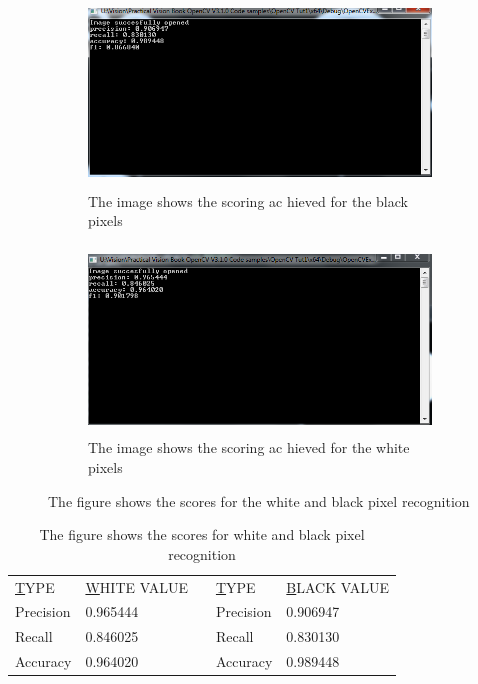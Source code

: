 \documentclass{article}
\begin{document}
\begin{figure}[H]
\begin{subfigure}{0.5\textwidth}
\includegraphics[width=0.9\linewidth, height=5cm]{N_BLK_STAT.PNG} 
\caption{The image shows the scoring ac hieved for the black pixels}
\label{fig:subim1}
\end{subfigure}
\begin{subfigure}{0.5\textwidth}
\includegraphics[width=0.9\linewidth, height=5cm]{N_WHT_STAT.PNG} 
\caption{The image shows the scoring ac hieved for the white pixels}
\label{fig:subim2}
\end{subfigure}
\caption{The figure shows the scores for the white and black pixel recognition}
\label{fig:image2}
\end{figure}

\begin{table}[H]
\centering
\caption{The figure shows the scores for white and black pixel recognition}
\label{my-label}
\begin{tabular}{@{}|l|l|l|l|l|@{}}
\cmidrule(r){1-2} \cmidrule(l){4-5}
{\ul TYPE} & {\ul WHITE VALUE} &  & {\ul TYPE} & {\ul BLACK VALUE} \\ \cmidrule(r){1-2} \cmidrule(l){4-5} 
Precision  &      0.965444       &  &    Precision        &  0.906947      \\ \cmidrule(r){1-2} \cmidrule(l){4-5} 
Recall     &      0.846025       &  &    Recall         &  0.830130     \\ \cmidrule(r){1-2} \cmidrule(l){4-5} 
Accuracy   &      0.964020       &  &    Accuracy         &  0.989448  \\ \cmidrule(r){1-2} \cmidrule(l){4-5} 
\end{tabular}
\end{table}
\end{document}
